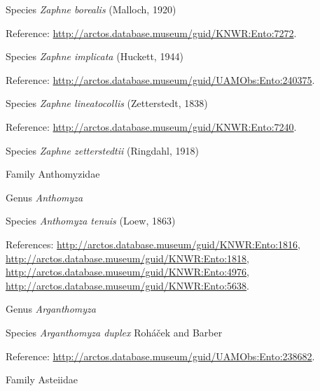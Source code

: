 \documentclass[9pt, article]{memoir}
\begin{document}
\begin{multicols}{2}
\vspace{6pt}\noindent\hspace{36pt}Species \textit{Zaphne borealis} (Malloch, 1920)


Reference: 
\url{http://arctos.database.museum/guid/KNWR:Ento:7272}.

\vspace{6pt}\noindent\hspace{36pt}Species \textit{Zaphne implicata} (Huckett, 1944)


Reference: 
\url{http://arctos.database.museum/guid/UAMObs:Ento:240375}.

\vspace{6pt}\noindent\hspace{36pt}Species \textit{Zaphne lineatocollis} (Zetterstedt, 1838)


Reference: 
\url{http://arctos.database.museum/guid/KNWR:Ento:7240}.

\vspace{6pt}\noindent\hspace{36pt}Species \textit{Zaphne zetterstedtii} (Ringdahl, 1918)


\vspace{6pt}\noindent\hspace{24pt}Family Anthomyzidae


\vspace{6pt}\noindent\hspace{30pt}Genus \textit{Anthomyza}


\vspace{6pt}\noindent\hspace{36pt}Species \textit{Anthomyza tenuis} (Loew, 1863)


References: 
\url{http://arctos.database.museum/guid/KNWR:Ento:1816}, 
\url{http://arctos.database.museum/guid/KNWR:Ento:1818}, 
\url{http://arctos.database.museum/guid/KNWR:Ento:4976}, 
\url{http://arctos.database.museum/guid/KNWR:Ento:5638}.

\vspace{6pt}\noindent\hspace{30pt}Genus \textit{Arganthomyza}


\vspace{6pt}\noindent\hspace{36pt}Species \textit{Arganthomyza duplex} Roháček and Barber


Reference: 
\url{http://arctos.database.museum/guid/UAMObs:Ento:238682}.

\vspace{6pt}\noindent\hspace{24pt}Family Asteiidae



\end{multicols}
\end{document}
